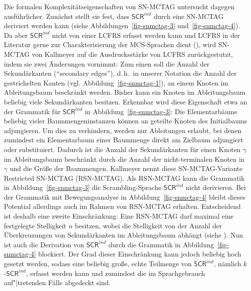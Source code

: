 Die formalen Komplexitätseigenschaften von SN-MCTAG untersucht \cite{Kallmeyer:05} dagegen ausführlicher. Zunächst stellt sie fest, dass $\mathsf{SCR}^{ind}$ durch eine SN-MCTAG deriviert werden kann (siehe Abbildungen~\ref{fig-snmctag-3} und~\ref{fig-snmctag-4}). Da aber $\mathsf{SCR}^{ind}$ nicht von einer LCFRS erfasst werden kann \citep{Becker:Rambow:Niv:92} und LCFRS in der Literatur gerne zur Charakterisierung der MCS-Sprachen dient (\citealt{Kallmeyer:10b}), wird SN-MCTAG von Kallmeyer auf die Ausdrucksstärke von LCFRS zurückgestutzt, indem sie zwei Änderungen vornimmt: Zum einen soll die Anzahl der Sekundärkanten ("`secondary edges"'), d.\,h.\ in unserer Notation die Anzahl der gestrichelten Kanten (vgl. Abbildung~\ref{fig-snmctag-1}), an einem Knoten im Ableitungsbaum beschränkt werden. Bisher kann ein Knoten im Ableitungsbaum beliebig viele Sekundärkanten besitzen. Erkennbar wird diese Eigenschaft etwa an der Grammatik für $\mathsf{SCR}^{ind}$ in Abbildung~\ref{fig-snmctag-3}: Die Elementarbäume beliebig vieler Baummengeninstanzen können an geteilte Knoten des Initialbaums adjungieren. Um dies zu verhindern, werden nur Ableitungen erlaubt, bei denen zumindest ein Elementarbaum einer Baummenge direkt am Zielbaum adjungiert oder substituiert. Dadurch ist die Anzahl der Sekundärkanten für einen Knoten $\gamma$ im Ableitungsbaum beschränkt durch die Anzahl der nicht-terminalen Knoten in $\gamma$ und die Grö\ss e der Baummengen. Kallmeyer nennt diese SN-MCTAG-Variante Restricted SN-MCTAG (RSN-MCTAG). Als RSN-MCTAG  kann die Grammatik in Abbildung~\ref{fig-snmctag-3} die Scrambling-Sprache $\mathsf{SCR}^{ind}$ nicht derivieren. Bei der Grammatik mit Bewegungsanalyse in Abbildung~\ref{fig-snmctag-4} bleibt dieses Potential allerdings auch im Rahmen von RSN-MCTAG erhalten. Entscheidend ist deshalb eine zweite Einschränkung: Eine RSN-MCTAG darf maximal eine festgelegte Stelligkeit $n$ besitzen, wobei die Stelligkeit von der Anzahl der Überkreuzungen von Sekundärkanten im Ableitungsbaum abhängt (siehe \citealt[212f]{Kallmeyer:05}). Nun ist auch die Derivation von $\mathsf{SCR}^{ind}$ durch die Grammatik in Abbildung~\ref{fig-snmctag-4} blockiert. Der Grad dieser Einschränkung kann jedoch beliebig hoch gesetzt werden, sodass eine beliebig gro\ss e, echte Teilmenge von $\mathsf{SCR}^{ind}$, nämlich $k$-$\mathsf{SCR}^{ind}$,  erfasst werden kann und zumindest die im Sprachgebrauch auf"|tretenden Fälle abgedeckt sind.   \\

